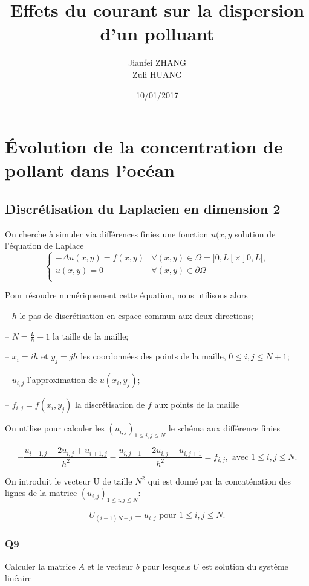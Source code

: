 \documentclass[titlepage,11pt,a4paper]{article}
\title[MAP 411 MINI Project]{Effets du courant sur la dispersion d'un polluant}
\author{Jianfei \textsc{ZHANG}\\
            Zuli \textsc{HUANG}
            }
\date{10/01/2017}
\begin{document}

\section{Évolution de la concentration de pollant dans l'océan}
\subsection{Discrétisation du Laplacien en dimension 2}
On cherche à simuler via différences finies une fonction $u(x, y$ solution de l'équation de Laplace
\begin{equation}
\left\{
\begin{array}{lll}
-\Delta u(x,y) = f(x,y) & \forall (x, y) \in \Omega = ]0, L[ \times ]0, L[,\\
u(x, y) = 0 & \forall (x,y) \in \partial\Omega\\
\end{array}
\right.
\label{equ:equation_de_laplace}
\end{equation}

Pour résoudre numériquement cette équation, nous utilisons alors

-- $h$ le pas de discrétisation en espace commun aux deux directions;

-- $N=\frac L h -1$ la taille de la maille;

-- $x_i = ih$ et $y_j = jh$ les coordonnées des points de la maille, $0\leqslant i, j \leqslant N+1$;

-- $u_{i,j}$ l'approximation de $u(x_i, y_j)$;

-- $f_{i,j} = f(x_i, y_j)$ la discrétisation de $f$ aux points de la maille

On utilise pour calculer les $(u_{i,j})_{1\leqslant i,j\leqslant N}$ le schéma aux différence finies

$$
-\frac{u_{i-1, j} - 2u_{i,j} + u_{i+1, j}}{h^2} - \frac{u_{i, j-1} - 2u_{i,j} + u_{i, j+1}}{h^2} = f_{i,j}, \mbox{ avec }1\leqslant i,j\leqslant N.
$$

On introduit le vecteur U de taille $N^2$ qui est donné par la concaténation des lignes de la matrice $(u_{i, j})_{1\leqslant i, j \leqslant N}$:

$$
U_{(i-1)N + j}=u_{i,j} \mbox{ pour } 1 \leqslant i, j\leqslant N.
$$

\subsubsection{Q9}
Calculer la matrice $A$ et le vecteur $b$ pour lesquels $U$ est solution du système linéaire
\end{document}
